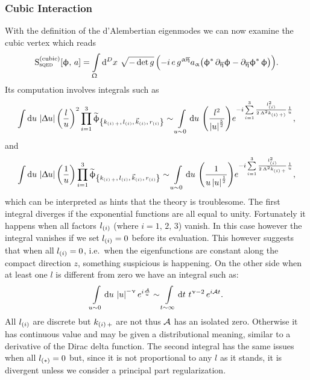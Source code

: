 \subsubsection{Cubic Interaction}

With the definition of the d'Alembertian eigenmodes we can now examine the cubic vertex which reads
\begin{equation}
  \rS_{\text{s}\qed}^{(\text{cubic})}\qty[\phi,\, a]
  =
  \int\limits_{\Omega} \dd[D]{x}\,
  \sqrt{- \det g}\,
  \qty(%
    -i\, e\,
    g^{\alpha\beta}
    a_{\alpha}
    \qty(%
      \phi^*\, \ipd{\beta} \phi
      -
      \ipd{\beta} \phi^*\, \phi
    )
  ).
\end{equation}
Its computation involves integrals such as
\begin{equation}
  \int \dd{u}\,
  \abs{\Delta u}\,
  \qty(\frac{l}{u})^2
  \finiteprod{i}{1}{3} \tphi_{\kmkrN{i}}
  \sim
  \int\limits_{u \sim 0} \dd{u}\, 
  \qty(\frac{l^2}{\abs{u}^{\frac{5}{2}}})
  e^{%
    -i \finitesum{i}{1}{3} \frac{l_{\qty(i)}^2}{2\, \Delta^2 k_{\qty(i)\, +)}}
    \frac{1}{u}
  },
\end{equation}
and
\begin{equation}
  \int \dd{u}\,
  \abs{\Delta u}\,
  \qty(\frac{1}{u})
  \finiteprod{i}{1}{3} \tphi_{\kmkrN{i}}
  \sim
  \int\limits_{u \sim 0} \dd{u}\, 
  \qty(\frac{1}{u\, \abs{u}^{\frac{1}{2}}})
  e^{%
    -i \finitesum{i}{1}{3} \frac{l_{\qty(i)}^2}{2\, \Delta^2 k_{\qty(i)\, +}}
    \frac{1}{u}
  },
  \label{eq:nbo_div_integral}
\end{equation}
which can be interpreted as hints that the theory is troublesome.
The first integral diverges if the exponential functions are all equal to unity.
Fortunately it happens when all factors $l_{\qty(i)}$ (where $i = 1,\, 2,\, 3$) vanish.
In this case however the integral vanishes if we set $l_{\qty(i)} = 0$ before its evaluation.
This however suggests that when all $l_{\qty(i)} = 0$, i.e.\ when the eigenfunctions are constant along the compact direction $z$, something suspicious is happening.
On the other side when at least one $l$ is different from zero we have an integral such as:
\begin{equation}
  \int\limits_{u \sim 0} \dd{u}\, 
  \abs{u}^{-\upnu}\, e^{i \frac{\mathcal{A}}{u}}
  \sim
  \int\limits_{t \sim \infty} \dd{t}\, 
  t^{\upnu-2}\, e^{i \mathcal{A} t}.
\end{equation}
All $l_{\qty(i)}$ are discrete but $k_{\qty(i)\, +}$ are not thus $\mathcal{A}$ has an isolated zero.
Otherwise it has continuous value and may be given a distributional meaning, similar to a derivative of the Dirac delta function.
The second integral has the same issues when all $l_{\qty(*)} = 0$ but, since it is not proportional to any $l$ as it stands, it is divergent unless we consider a principal part regularization.

